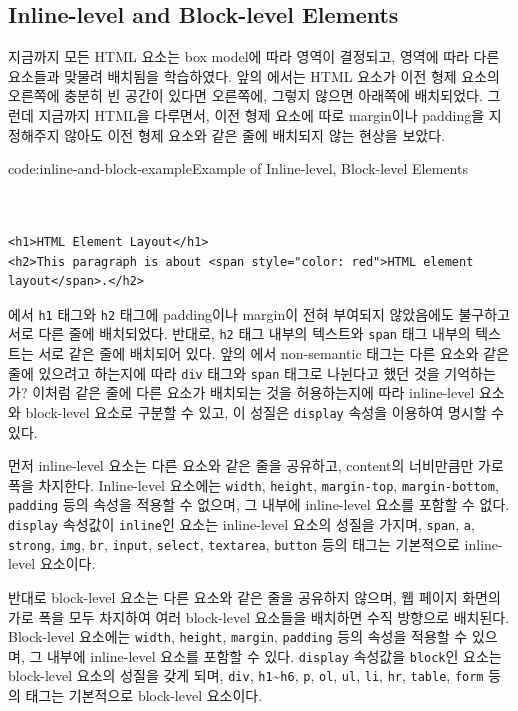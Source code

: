 \subsection*{Inline-level and Block-level Elements}

지금까지 모든 HTML 요소는 box model에 따라 영역이 결정되고, 영역에 따라 다른 요소들과 맞물려 배치됨을 학습하였다. 앞의 에서는 HTML 요소가 이전 형제 요소의 오른쪽에 충분히 빈 공간이 있다면 오른쪽에, 그렇지 않으면 아래쪽에 배치되었다. 그런데 지금까지 HTML을 다루면서, 이전 형제 요소에 따로 margin이나 padding을 지정해주지 않아도 이전 형제 요소와 같은 줄에 배치되지 않는 현상을 보았다.

\begin{codeenv}{code:inline-and-block-example}{Example of Inline-level, Block-level Elements}\begin{verbatim}


<h1>HTML Element Layout</h1>
<h2>This paragraph is about <span style="color: red">HTML element layout</span>.</h2>
\end{verbatim}
\end{codeenv}

에서 \texttt{h1} 태그와 \texttt{h2} 태그에 padding이나 margin이 전혀 부여되지 않았음에도 불구하고 서로 다른 줄에 배치되었다. 반대로, \texttt{h2} 태그 내부의 텍스트와 \texttt{span} 태그 내부의 텍스트는 서로 같은 줄에 배치되어 있다. 앞의 에서 non-semantic 태그는 다른 요소와 같은 줄에 있으려고 하는지에 따라 \texttt{div} 태그와 \texttt{span} 태그로 나뉜다고 했던 것을 기억하는가? 이처럼 같은 줄에 다른 요소가 배치되는 것을 허용하는지에 따라 inline-level 요소와 block-level 요소로 구분할 수 있고, 이 성질은 \texttt{display} 속성을 이용하여 명시할 수 있다.

먼저 inline-level 요소는 다른 요소와 같은 줄을 공유하고, content의 너비만큼만 가로 폭을 차지한다. Inline-level 요소에는 \texttt{width}, \texttt{height}, \texttt{margin-top}, \texttt{margin-bottom}, \texttt{padding} 등의 속성을 적용할 수 없으며, 그 내부에 inline-level 요소를 포함할 수 없다. \texttt{display} 속성값이 \texttt{inline}인 요소는 inline-level 요소의 성질을 가지며, \texttt{span}, \texttt{a}, \texttt{strong}, \texttt{img}, \texttt{br}, \texttt{input}, \texttt{select}, \texttt{textarea}, \texttt{button} 등의 태그는 기본적으로 inline-level 요소이다. 

반대로 block-level 요소는 다른 요소와 같은 줄을 공유하지 않으며, 웹 페이지 화면의 가로 폭을 모두 차지하여 여러 block-level 요소들을 배치하면 수직 방향으로 배치된다. Block-level 요소에는 \texttt{width}, \texttt{height}, \texttt{margin}, \texttt{padding} 등의 속성을 적용할 수 있으며, 그 내부에 inline-level 요소를 포함할 수 있다. \texttt{display} 속성값을 \texttt{block}인 요소는 block-level 요소의 성질을 갖게 되며, \texttt{div}, \texttt{h1}\textasciitilde\texttt{h6}, \texttt{p}, \texttt{ol}, \texttt{ul}, \texttt{li}, \texttt{hr}, \texttt{table}, \texttt{form} 등의 태그는 기본적으로 block-level 요소이다.

